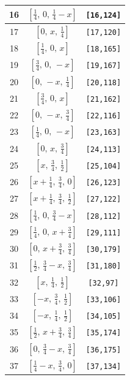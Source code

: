 \documentclass[fleqn,8pt]{jsarticle}
\begin{document}
\begin{longtable}{ccc}
16 & $\left[ \frac{1}{4},\, 0,\, \frac{1}{4} - x \right]$ & {\tt [16,124]} \\ \hline
17 & $\left[ 0,\, x,\, \frac{1}{4} \right]$ & {\tt [17,120]} \\ \hline
18 & $\left[ \frac{1}{4},\, 0,\, x \right]$ & {\tt [18,165]} \\ \hline
19 & $\left[ \frac{3}{4},\, 0,\, - x \right]$ & {\tt [19,167]} \\ \hline
20 & $\left[ 0,\, - x,\, \frac{1}{4} \right]$ & {\tt [20,118]} \\ \hline
21 & $\left[ \frac{3}{4},\, 0,\, x \right]$ & {\tt [21,162]} \\ \hline
22 & $\left[ 0,\, - x,\, \frac{3}{4} \right]$ & {\tt [22,116]} \\ \hline
23 & $\left[ \frac{1}{4},\, 0,\, - x \right]$ & {\tt [23,163]} \\ \hline
24 & $\left[ 0,\, x,\, \frac{3}{4} \right]$ & {\tt [24,113]} \\ \hline
25 & $\left[ x,\, \frac{3}{4},\, \frac{1}{2} \right]$ & {\tt [25,104]} \\ \hline
26 & $\left[ x + \frac{1}{4},\, \frac{3}{4},\, 0 \right]$ & {\tt [26,123]} \\ \hline
27 & $\left[ x + \frac{1}{4},\, \frac{3}{4},\, \frac{1}{2} \right]$ & {\tt [27,122]} \\ \hline
28 & $\left[ \frac{1}{4},\, 0,\, \frac{3}{4} - x \right]$ & {\tt [28,112]} \\ \hline
29 & $\left[ \frac{1}{4},\, 0,\, x + \frac{3}{4} \right]$ & {\tt [29,111]} \\ \hline
30 & $\left[ 0,\, x + \frac{3}{4},\, \frac{3}{4} \right]$ & {\tt [30,179]} \\ \hline
31 & $\left[ \frac{1}{2},\, \frac{3}{4} - x,\, \frac{3}{4} \right]$ & {\tt [31,180]} \\ \hline
32 & $\left[ x,\, \frac{1}{4},\, \frac{1}{2} \right]$ & {\tt [32,97]} \\ \hline
33 & $\left[ - x,\, \frac{3}{4},\, \frac{1}{2} \right]$ & {\tt [33,106]} \\ \hline
34 & $\left[ - x,\, \frac{1}{4},\, \frac{1}{2} \right]$ & {\tt [34,105]} \\ \hline
35 & $\left[ \frac{1}{2},\, x + \frac{3}{4},\, \frac{3}{4} \right]$ & {\tt [35,174]} \\ \hline
36 & $\left[ 0,\, \frac{3}{4} - x,\, \frac{3}{4} \right]$ & {\tt [36,175]} \\ \hline
37 & $\left[ \frac{1}{4} - x,\, \frac{3}{4},\, 0 \right]$ & {\tt [37,134]} \\ \hline

\end{longtable}
\end{document}
